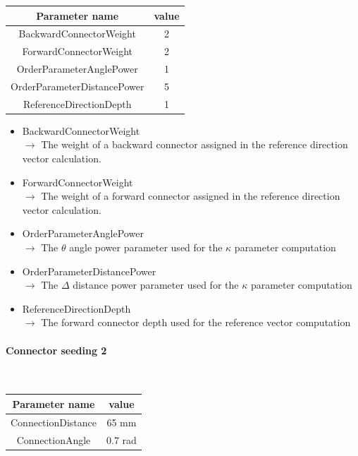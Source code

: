 \documentclass[cits]{JINST}
\begin{document}
\begin{table}[!ht]
  \begin{center}
    \begin{tabu} to \linewidth { c | c } 
          Parameter name & value \\
          \hline
          BackwardConnectorWeight & 2 \\
          ForwardConnectorWeight & 2 \\
          OrderParameterAnglePower & 1 \\
          OrderParameterDistancePower & 5 \\
          ReferenceDirectionDepth & 1
    \end{tabu} 
  \end{center}
\end{table}

\begin{itemize}
  \item BackwardConnectorWeight \\
  $\rightarrow$ The weight of a backward connector assigned in the reference direction vector calculation.
  \item ForwardConnectorWeight \\
  $\rightarrow$ The weight of a forward connector assigned in the reference direction vector calculation.
  \item OrderParameterAnglePower \\
  $\rightarrow$ The $\theta$ angle power parameter used for the $\kappa$ parameter computation
  \item OrderParameterDistancePower \\
  $\rightarrow$ The $\Delta$ distance power parameter used for the $\kappa$ parameter computation
  \item ReferenceDirectionDepth \\
  $\rightarrow$ The forward connector depth used for the reference vector computation
\end{itemize}


\paragraph{Connector seeding 2} ~

\begin{table}[!ht]
  \begin{center}
    \begin{tabu} to \linewidth { c | c } 
          Parameter name & value \\
          \hline
          ConnectionDistance & 65 mm \\
          ConnectionAngle & 0.7 rad
    \end{tabu} 
  \end{center}
\end{table}
\end{document}
